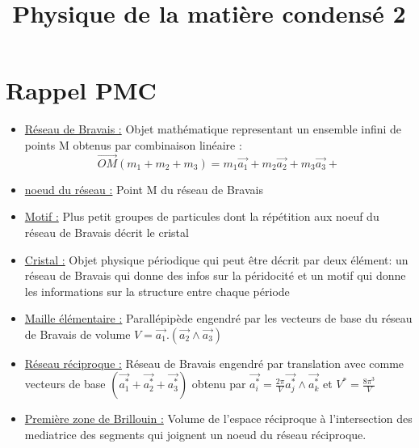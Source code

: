 \documentclass{article}
\begin{document}
\title{Physique de la matière condensé 2}
\date{}
\maketitle
\tableofcontents

\section{Rappel PMC}
\begin{itemize}
    \item \underline{Réseau de Bravais :} Objet mathématique representant un ensemble infini de points M obtenus par combinaison linéaire :
    $$\vec{OM}(m_1+m_2+m_3)=m_1\vec{a_1}+m_2\vec{a_2}+m_3\vec{a_3}+$$
    \item \underline{noeud du réseau :} Point M du réseau de Bravais
    \item \underline{Motif :} Plus petit groupes de particules dont la répétition aux noeuf du réseau de Bravais décrit le cristal
    \item \underline{Cristal :} Objet physique périodique qui peut être décrit par deux élément: un réseau de Bravais qui donne des infos sur la péridocité et un motif qui donne les informations sur la structure entre chaque période
    \item \underline{Maille élémentaire :} Parallépipède engendré par les vecteurs de base du réseau de Bravais de volume $V=\vec{a_1}.(\vec{a_2}\wedge \vec{a_3})$
    \item \underline{Réseau réciproque :} Réseau de Bravais engendré par translation avec comme vecteurs de base $(\vec{a_1^*}+\vec{a_2^*}+\vec{a_3^*})$ obtenu par $\vec{a_i^*}=\frac{2 \pi}{V}\vec{a_j^*}\wedge \vec{a_k^*}$ et $V^*=\frac{8\pi^3}{V}$
    \item \underline{Première zone de Brillouin :} Volume de l'espace réciproque à l'intersection des mediatrice des segments qui joignent un noeud du réseau réciproque.
\end{itemize}

\newpage
\end{document}
